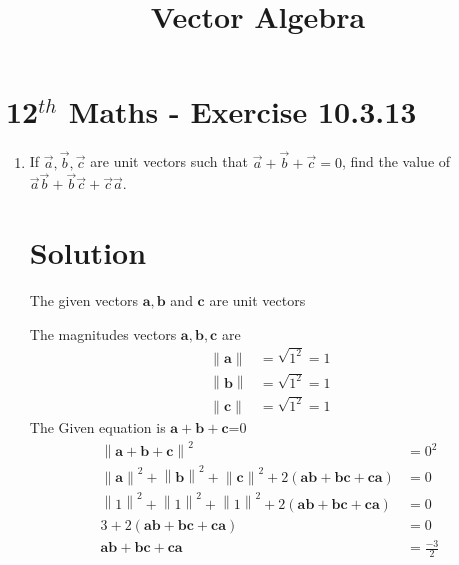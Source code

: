 \documentclass[12pt]{article}
\providecommand{\norm}[1]{\left\lVert#1\right\rVert}
\let\vec\mathbf
\begin{document}
\begin{center}
\title{\textbf{Vector Algebra}}
\date{\vspace{-5ex}} %
\maketitle
\end{center}
\setcounter{page}{1}
\section{12$^{th}$ Maths - Exercise 10.3.13}
\begin{enumerate}
\item If $\overrightarrow{a},\overrightarrow{b},\overrightarrow{c}$ are unit vectors such that $\overrightarrow{a}+\overrightarrow{b}+\overrightarrow{c}=0$, find the value of $\overrightarrow{a}\overrightarrow{b}+\overrightarrow{b}\overrightarrow{c}+\overrightarrow{c}\overrightarrow{a}$.  
\section{Solution}
The given vectors $\vec{a},\vec{b}$ and $\vec{c}$ are unit vectors
                
                The magnitudes vectors $\vec{a},\vec{b},\vec{c}$ are
        \begin{align}
\norm{\vec{a}} &=\sqrt{1^2}=1\\ \norm{\vec{b}}&=\sqrt{1^2}=1\\ \norm{\vec{c}}&=\sqrt{1^2}=1
        \end{align}
The Given equation is $\vec{a}+\vec{b}+\vec{c}$=0      
\begin{align}
\norm{\vec{a}+{\vec{b}}+{\vec{c}}}^2&=0^2\\
\norm{\vec{a}}^2+\norm{\vec{b}}^2+\norm{\vec{c}}^2+2({\vec{a}}{\vec{b}}+{\vec{b}}{\vec{c}}+{\vec{c}}{\vec{a}})&=0\\
\norm{1}^2+\norm{1}^2+\norm{1}^2+2({\vec{a}}{\vec{b}}+{\vec{b}}{\vec{c}}+{\vec{c}}{\vec{a}})&=0\\
3+2({\vec{a}}{\vec{b}}+{\vec{b}}{\vec{c}}+{\vec{c}}{\vec{a}})&=0\\
{\vec{a}}{\vec{b}}+{\vec{b}}{\vec{c}}+{\vec{c}}{\vec{a}}&=\frac{-3}{2}
\end{align}
\end{enumerate}
\end{document}
